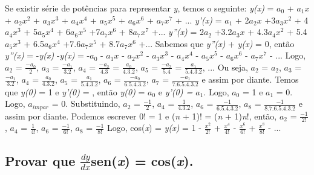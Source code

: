 Se existir série de potências para representar \textit{y}, temos o seguinte:
\newline
\textit{y(x)} = ${a_0}$ + ${a_1}$${x}$ + ${a_2}$${x^2}$ + ${a_3}$${x^3}$ + ${a_4}$${x^4}$ + ${a_5}$${x^5}$ + ${a_6}$${x^6}$ + ${a_7}$${x^7}$ + ...
\newline
\textit{y'(x)} = ${a_1}$ + 2${a_2}$${x}$ +3${a_3}$${x^2}$ + 4${a_4}$${x^3}$ + 5${a_5}$${x^4}$ + 6${a_6}$${x^5}$ +7${a_7}$${x^6}$ + 8${a_7}$${x^7}$ +...
\newline
\textit{y''(x)} = 2${a_2}$ +3.2${a_3}$${x}$ + 4.3${a_4}$${x^2}$ + 5.4${a_5}$${x^3}$ + 6.5${a_6}$${x^4}$ +7.6${a_7}$${x^5}$ + 8.7${a_7}$${x^6}$ +...
\newline
Sabemos que \textit{y''(x)} + \textit{y(x)} = 0, então \textit{y''(x)} = -\textit{y(x)}
\newline
-\textit{y(x)} = -${a_0}$ - ${a_1}$${x}$ - ${a_2}$${x^2}$ - ${a_3}$${x^3}$ - ${a_4}$${x^4}$ - ${a_5}$${x^5}$ - ${a_6}$${x^6}$ - ${a_7}$${x^7}$ - ...
\newline
Logo, ${a_2}$ = $\frac{-{a_0}}{2}$, ${a_3}$ = $\frac{-{a_1}}{3.2}$, ${a_4}$ = $\frac{-{a_2}}{4.3}$ = $\frac{{a_0}}{4.3.2}$, ${a_5}$ = $\frac{-{a_3}}{5.4}$ = $\frac{{a_1}}{5.4.3.2}$, ...
\newline
Ou seja,  ${a_2}$ = ${a_2}$,  ${a_3}$ = $\frac{-{a_1}}{3.2}$,  ${a_4}$ = $\frac{{a_0}}{4.3.2}$,  ${a_5}$ = $\frac{{a_1}}{5.4.3.2}$,  ${a_6}$ = $\frac{-{a_0}}{6.5.4.3.2}$,  ${a_7}$ = $\frac{-{a_1}}{7.6.5.4.3.2}$ e assim por diante.
\newline
Temos que  \textit{y(0)} = 1 e \textit{y'(0)} = , então \textit{y(0)} = ${a_0}$ e \textit{y'(0) = ${a_1}$}. Logo, ${a_0}$ = 1 e ${a_1}$ = 0.  Logo, ${a_{impar}}$ = 0.
\newline
Substituindo, ${a_2}$ = $\frac{{-1}}{2}$, ${a_4}$ = $\frac{{1}}{4.3.2}$, ${a_6}$ = $\frac{{-1}}{6.5.4.3.2}$, ${a_8}$ = $\frac{{-1}}{8.7.6.5.4.3.2}$ e assim por diante.
\newline
Podemos escrever 0! = 1 e (\textit{n} + 1)! = (\textit{n} + 1)\textit{n}!, então,  ${a_2}$ = $\frac{{-1}}{2!}$, ${a_4}$ = $\frac{{1}}{4!}$, ${a_6}$ = $\frac{{-1}}{6!}$, ${a_8}$ = $\frac{{-1}}{8!}$
\newline
Logo, cos(\textit{x}) = \textit{y(x)} = 1 - $\frac{x^2}{2!}$ + $\frac{x^4}{4!}$ - $\frac{x^6}{6!}$ + $\frac{x^8}{8!}$ - ...


\subsection{Provar que $\frac{dy}{dx}$sen(\textit{x}) = cos(\textit{x}).}


